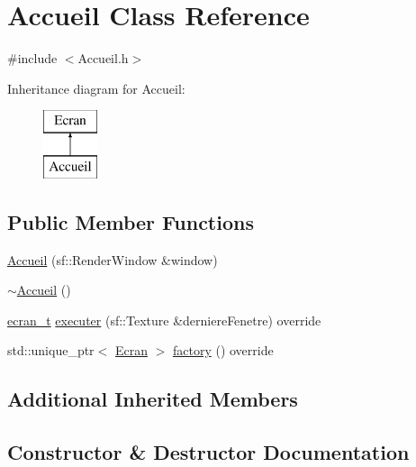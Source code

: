 \hypertarget{class_accueil}{}\section{Accueil Class Reference}
\label{class_accueil}


{\ttfamily \#include $<$Accueil.\+h$>$}

Inheritance diagram for Accueil\+:\begin{figure}[H]
\begin{center}
\leavevmode
\includegraphics[height=2.000000cm]{class_accueil}
\end{center}
\end{figure}
\subsection*{Public Member Functions}
\begin{DoxyCompactItemize}
\item 
\mbox{\hyperlink{class_accueil_aee83ee3052a73a4482d88e1c0814db05}{Accueil}} (sf\+::\+Render\+Window \&window)
\item 
\mbox{\hyperlink{class_accueil_a42a925af8942c76a73957ac9abcd45d7}{$\sim$\+Accueil}} ()
\item 
\mbox{\hyperlink{constantes_8h_a33e4f15dde10f34860a6b35be343ae56}{ecran\+\_\+t}} \mbox{\hyperlink{class_accueil_adfc33857bbaeedd9cac862b90bb79e4e}{executer}} (sf\+::\+Texture \&derniere\+Fenetre) override
\item 
std\+::unique\+\_\+ptr$<$ \mbox{\hyperlink{class_ecran}{Ecran}} $>$ \mbox{\hyperlink{class_accueil_a4448beee6ac1cc997afed55ebd4b9367}{factory}} () override
\end{DoxyCompactItemize}
\subsection*{Additional Inherited Members}


\subsection{Constructor \& Destructor Documentation}
\mbox{\label{class_accueil_aee83ee3052a73a4482d88e1c0814db05}} 
